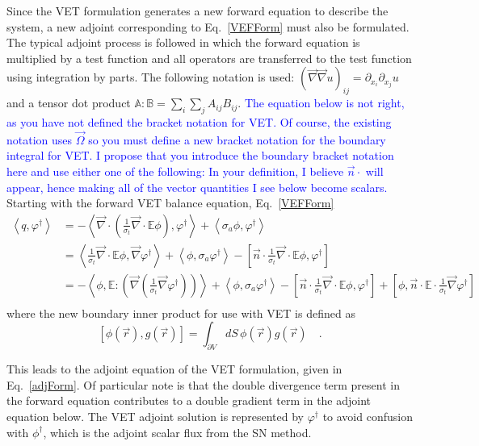 \documentclass[12pt]{report}
\newcommand{\vr}{\vec{r}}
\newcommand{\vO}{\vec{\Omega}}
\newcommand{\bra}{\left\langle}
\newcommand{\ket}{\right\rangle}
\newcommand{\sbra}{\left[}
\newcommand{\sket}{\right]}
\renewcommand{\div}{\vec{\nabla} \cdot}
\newcommand{\grad}{\vec{\nabla}}
\newcommand{\vefadj}{\varphi^\dag}
\newcommand{\vn}{\vec{n}}
\newcommand{\Edd}{\mathbb{E}}
\newcommand{\sigt}{\sigma_t}
\newcommand{\siga}{\sigma_a}
\newcommand{\scalSource}{q}
\newcommand{\comment}[2]{\marginpar{\textcolor{#2}{$\star$}}\textcolor{#2}{#1}\newline}
\newcommand{\jcr}[1]{\comment{#1}{blue}}
\newcommand{\jcr}[1]{\phantom{a}}
\begin{document}
Since the VET formulation generates a new forward equation to describe the system, a new adjoint corresponding to Eq.~\eqref{VEFForm} must also be formulated. The typical adjoint process is followed in which the forward equation is multiplied by a test function and all operators are transferred to the test function using integration by parts. The following notation is used: $(\grad \grad u)_{ij} = \partial_{x_i} \partial_{x_j} u$
and a tensor dot product $\mathbb{A} : \mathbb{B} = \sum_i \sum_j A_{ij}B_{ij}$.
\jcr{
The equation below is not right, as you have not defined the bracket notation for VET. Of course, the existing notation uses $\vO$ so you must define a new bracket notation for the boundary integral for VET. I  propose that you introduce the boundary bracket notation here and use either one of the following:
In your definition, I believe $\vn \cdot$ will appear, hence making all of the vector quantities I see below become scalars.}
Starting with the forward VET balance equation, Eq.~\eqref{VEFForm}
\begin{equation}
\label{VEFadjFormDeriv}
\begin{split}
\bra \scalSource , \vefadj \ket &= - \bra \div \left( \frac{1}{\sigt}\div \Edd \phi \right), \vefadj \ket +  \bra \siga \phi, \vefadj \ket   \\
&= \bra \frac{1}{\sigt}\div \Edd \phi, \grad \vefadj \ket  +  \bra  \phi, \siga \vefadj \ket - \sbra \vn \cdot \frac{1}{\sigt}\div \Edd \phi, \vefadj \sket   \\
 &=  - \bra \phi, \Edd : \left( \grad \left( \frac{1}{\sigt}\grad \vefadj \right) \right) \ket  +  \bra  \phi, \siga \vefadj \ket - \sbra \vn \cdot  \frac{1}{\sigt}\div \Edd \phi, \vefadj \sket + \sbra \phi, \vn \cdot  \Edd \cdot \frac{1}{\sigt} \grad \vefadj \sket \\
\end{split}
\end{equation}
where the new boundary inner product for use with VET is defined as
\begin{equation}
\sbra \phi(\vr) , g(\vr)  \sket = \int_{\partial V} dS \, \phi (\vr) g (\vr)  \quad .
\end{equation}

This leads to the adjoint equation of the VET formulation, given in Eq.~\eqref{adjForm}. Of particular note is that the double divergence term present in the forward equation contributes to a double gradient term in the adjoint equation below. The VET adjoint solution is represented by $\vefadj$ to avoid confusion with $\phi^\dag$, which is the adjoint scalar flux from the SN method. 
\end{document}
